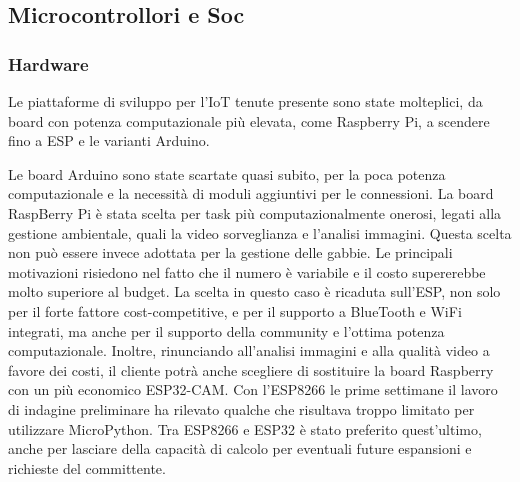         \subsection{Microcontrollori e Soc}
        \subsubsection{Hardware}
        Le piattaforme di sviluppo per l'IoT tenute presente sono state molteplici, da board con potenza computazionale più elevata, come Raspberry Pi, a scendere fino a ESP e le varianti Arduino. 
        
        Le board Arduino sono state scartate quasi subito, per la poca potenza computazionale e la necessità di moduli aggiuntivi per le connessioni. 
        La board RaspBerry Pi è stata scelta per task più computazionalmente onerosi, legati alla gestione ambientale, quali la video sorveglianza e l'analisi immagini. 
        Questa scelta non può essere invece adottata per la gestione delle gabbie. Le principali motivazioni risiedono nel fatto che il numero è variabile e il costo supererebbe molto superiore al budget. 
        La scelta in questo caso è ricaduta sull'ESP, non solo per il forte fattore cost-competitive, e per il supporto a BlueTooth e WiFi integrati, ma anche per il supporto della community e l'ottima potenza computazionale. Inoltre, rinunciando all'analisi immagini e alla qualità video a favore dei costi, il cliente potrà anche scegliere di sostituire la board Raspberry con un più economico ESP32-CAM.
        Con l'ESP8266 le prime settimane il lavoro di indagine preliminare ha rilevato qualche che risultava troppo limitato per utilizzare MicroPython.
        Tra ESP8266 e ESP32 è stato preferito quest'ultimo, anche per lasciare della capacità di calcolo per eventuali future espansioni e richieste del committente. 
